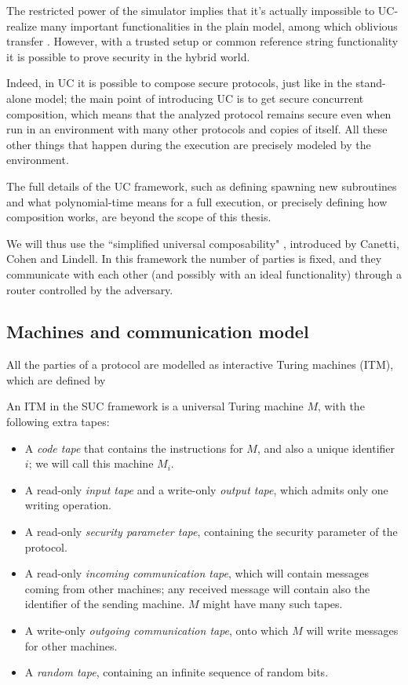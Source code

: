 The restricted power of the simulator implies that it's actually impossible to UC-realize many important functionalities in the plain model, among which oblivious transfer \cite{Canetti_limitations}. However, with a trusted setup or common reference string functionality it is possible to prove security in the hybrid world.

Indeed, in UC it is possible to compose secure protocols, just like in the stand-alone model; the main point of introducing UC is to get secure concurrent composition, which means that the analyzed protocol remains secure even when run in an environment with many other protocols and copies of itself. All these other things that happen during the execution are precisely modeled by the environment.

The full details of the UC framework, such as defining spawning new subroutines and what polynomial-time means for a full execution, or precisely defining how composition works, are beyond the scope of this thesis.

We will thus use the ``simplified universal composability" \cite{Canetti_SUC}, introduced by Canetti, Cohen and Lindell. In this framework the number of parties is fixed, and they communicate with each other (and possibly with an ideal functionality) through a router controlled by the adversary.

\subsection{Machines and communication model}

All the parties of a protocol are modelled as interactive Turing machines (ITM), which are defined by
\begin{definition}
    An ITM in the SUC framework is a universal Turing machine $M$, with the following extra tapes:
    \begin{itemize}
        \item A \emph{code tape} that contains the instructions for $M$, and also a unique identifier $i$; we will call this machine $M_i$.
        \item A read-only \emph{input tape} and a write-only \emph{output tape}, which admits only one writing operation.
        \item A read-only \emph{security parameter tape}, containing the security parameter of the protocol.
        \item A read-only \emph{incoming communication tape}, which will contain messages coming from other machines; any received message will contain also the identifier of the sending machine. $M$ might have many such tapes.
        \item A write-only \emph{outgoing communication tape}, onto which $M$ will write messages for other machines.
        \item A \emph{random tape}, containing an infinite sequence of random bits.
    \end{itemize}
\end{definition}

